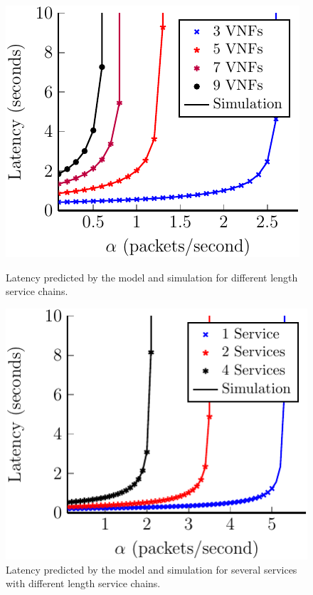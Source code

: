 \begin{figure}
\vspace{4mm}

\begin{minipage}[b]{.48\textwidth}
	\includegraphics[width=\linewidth]{graphs/diff_lengths-crop}
	\caption{Latency predicted by the model and simulation for different length
service chains.}
	\label{fig:length_chain}
\end{minipage}
\hfill
\begin{minipage}[b]{.48\textwidth}
	\includegraphics[width=\linewidth]{graphs/mult_services-crop}
	\caption{Latency predicted by the model and simulation for several services
with different length service chains.}
	\label{fig:mult_services}
\end{minipage}

\end{figure}


